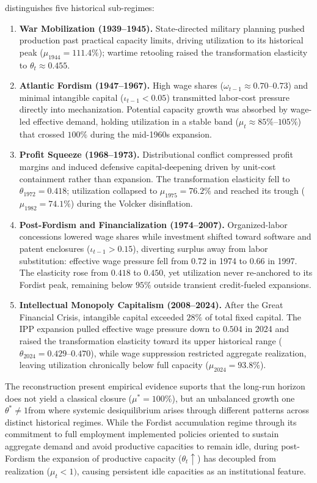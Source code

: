  distinguishes five historical
sub-regimes:
\begin{enumerate}
	\item \textbf{War Mobilization (1939--1945).} State-directed
	military planning pushed production past practical capacity
	limits, driving utilization to its historical peak
	($\mu_{1944} = 111.4\%$); wartime retooling raised the
	transformation elasticity to $\theta_t \approx 0.455$.
	\item \textbf{Atlantic Fordism (1947--1967).} High wage shares
	($\omega_{t-1} \approx 0.70$--$0.73$) and minimal intangible
	capital ($\iota_{t-1} < 0.05$) transmitted labor-cost
	pressure directly into mechanization. Potential capacity
	growth was absorbed by wage-led effective demand, holding
	utilization in a stable band
	($\mu_t \approx 85\%$--$105\%$) that crossed $100\%$
	during the mid-1960s expansion.
	\item \textbf{Profit Squeeze (1968--1973).} Distributional
	conflict compressed profit margins and induced defensive
	capital-deepening driven by unit-cost containment rather
	than expansion. The transformation elasticity fell to
	$\theta_{1972} = 0.418$; utilization collapsed to
	$\mu_{1975} = 76.2\%$ and reached its trough
	($\mu_{1982} = 74.1\%$) during the Volcker disinflation.
	\item \textbf{Post-Fordism and Financialization (1974--2007).}
	Organized-labor concessions lowered wage shares while
	investment shifted toward software and patent enclosures
	($\iota_{t-1} > 0.15$), diverting surplus away from labor
	substitution: effective wage pressure fell from $0.72$ in
	1974 to $0.66$ in 1997. The elasticity rose from $0.418$
	to $0.450$, yet utilization never re-anchored to its Fordist
	peak, remaining below $95\%$ outside transient credit-fueled
	expansions.
	\item \textbf{Intellectual Monopoly Capitalism (2008--2024).}
	After the Great Financial Crisis, intangible capital exceeded
	$28\%$ of total fixed capital. The IPP expansion pulled
	effective wage pressure down to $0.504$ in 2024 and raised
	the transformation elasticity toward its upper historical
	range ($\theta_{2024} = 0.429$--$0.470$), while wage
	suppression restricted aggregate realization, leaving
	utilization chronically below full capacity
	($\mu_{2024} = 93.8\%$).
\end{enumerate}

The reconstruction present empirical evidence suports that the long-run horizon does not yield a classical closure ($\mu^* = 100\%$), 
but an unbalanced growth one $\theta^* \neq 1 $from where systemic desiquilibrium arises through different patterns across distinct historical regimes.  
While the Fordist accumulation regime through its commitment to full employment implemented policies oriented to sustain aggregate demand and avoid productive capacities to remain idle, during post-Fordism the expansion of productive capacity ($\theta_t \uparrow$) has decoupled from realization ($\mu_t<1)$, causing persistent idle capacities as an institutional feature.


